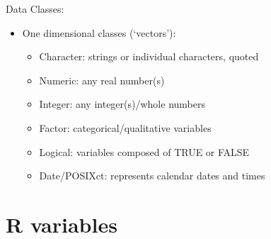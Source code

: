 \documentclass[
  ignorenonframetext,
]{beamer}
\providecommand{\tightlist}{%
  \setlength{\itemsep}{0pt}\setlength{\parskip}{0pt}}
\begin{document}
\begin{frame}{Data Classes:}
\protect\hypertarget{data-classes-1}{}

\begin{itemize}
\tightlist
\item
  One dimensional classes (`vectors'):

  \begin{itemize}
  \tightlist
  \item
    Character: strings or individual characters, quoted
  \item
    Numeric: any real number(s)
  \item
    Integer: any integer(s)/whole numbers
  \item
    Factor: categorical/qualitative variables
  \item
    Logical: variables composed of TRUE or FALSE
  \item
    Date/POSIXct: represents calendar dates and times
  \end{itemize}
\end{itemize}

\end{frame}

\hypertarget{r-variables-1}{%
\section{R variables}\label{r-variables-1}}
\end{document}

